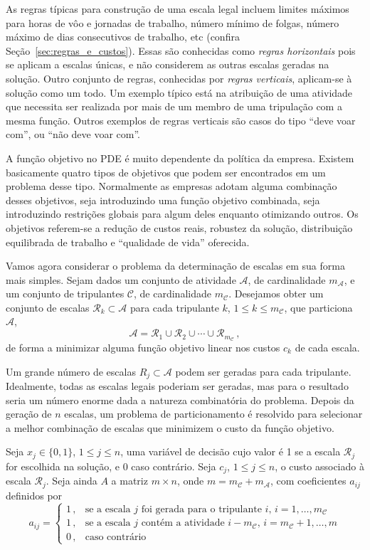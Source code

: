 \documentclass[12pt,a4paper]{article}
\newcommand{\ev}{\, ,}                                       %
\newcommand{\calA}{\mathcal{A}}
\newcommand{\calC}{\mathcal{C}}
\newcommand{\calR}{\mathcal{R}}
\begin{document}
As regras típicas para construção de uma escala legal incluem limites máximos para horas de vôo e
jornadas de trabalho, número mínimo de folgas, número máximo de dias consecutivos de trabalho, etc
(confira Seção~\ref{sec:regras_e_custos}). Essas são conhecidas como \emph{regras horizontais} pois
se aplicam a escalas únicas, e não considerem as outras escalas geradas na solução. Outro conjunto
de regras, conhecidas por \emph{regras verticais}, aplicam-se à solução como um todo. Um exemplo
típico está na atribuição de uma atividade que necessita ser realizada por mais de um membro de uma
tripulação com a mesma função. Outros exemplos de regras verticais são casos do tipo ``deve voar
com'', ou ``não deve voar com''.
 
A função objetivo no PDE é muito dependente da política da empresa. Existem basicamente quatro 
tipos de objetivos que podem ser encontrados em um problema desse tipo. Normalmente as empresas
adotam alguma combinação desses objetivos, seja introduzindo uma função objetivo combinada, seja
introduzindo restrições globais para algum deles enquanto otimizando outros. Os objetivos referem-se
a redução de custos reais, robustez da solução, distribuição equilibrada de trabalho e ``qualidade
de vida'' oferecida.

Vamos agora considerar o problema da determinação de escalas em sua forma mais simples. Sejam dados
um conjunto de atividade $\calA$, de cardinalidade $m_\calA$, e um conjunto de tripulantes $\calC$,
de cardinalidade $m_\calC$. Desejamos obter um conjunto de escalas $\calR_k \subset \calA$ para cada
tripulante $k$, $1 \leq k \leq m_\calC$, que particiona $\calA$,
%
\begin{equation*}
	\calA = \calR_1 \cup \calR_2 \cup \cdots \cup \calR_{m_\calC} \ev
\end{equation*}
%
de forma a minimizar alguma função objetivo linear nos custos $c_k$ de cada escala.

Um grande número de escalas $R_j \subset \calA$ podem ser geradas para cada tripulante. Idealmente,
todas as escalas legais poderiam ser geradas, mas para o resultado seria um número enorme dada a 
natureza combinatória do problema. Depois da geração de $n$ escalas, um problema de particionamento 
é resolvido para selecionar a melhor combinação de escalas que minimizem o custo da função objetivo.

Seja $x_j \in \{0, 1\}$, $1 \leq j \leq n$, uma variável de decisão cujo valor é 1 se a escala
$\calR_j$ for escolhida na solução, e 0 caso contrário. Seja $c_j$, $1 \leq j \leq n$, o custo 
associado à escala $\calR_j$. Seja ainda $A$ a matriz $m \times n$, onde $m = m_\calC + m_\calA$, 
com coeficientes $a_{ij}$ definidos por
%
\begin{equation*}
	a_{ij} = \left\{
	\begin{array}{ll}
			1 \ev & \text{se a escala $j$ foi gerada para o tripulante $i$, $i = 1, \ldots, m_\calC$} \\
			1 \ev & \text{se a escala $j$ contém a atividade $i - m_\calC$, 
			$i = m_\calC + 1, \ldots, m$} \\
			0 \ev & \text{caso contrário}
	\end{array}
	\right.
\end{equation*}
\end{document}
